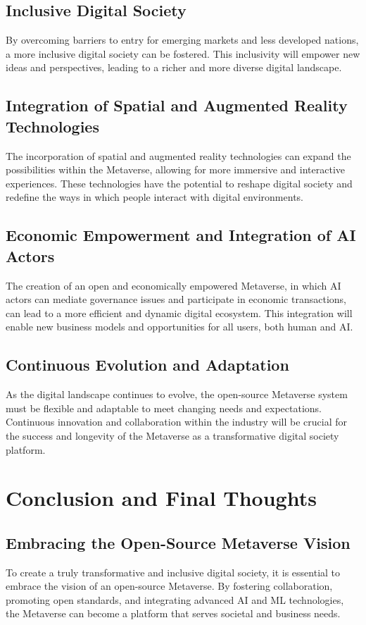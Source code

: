 \subsection{Inclusive Digital Society}
By overcoming barriers to entry for emerging markets and less developed nations, a more inclusive digital society can be fostered. This inclusivity will empower new ideas and perspectives, leading to a richer and more diverse digital landscape.

\subsection{Integration of Spatial and Augmented Reality Technologies}
The incorporation of spatial and augmented reality technologies can expand the possibilities within the Metaverse, allowing for more immersive and interactive experiences. These technologies have the potential to reshape digital society and redefine the ways in which people interact with digital environments.

\subsection{Economic Empowerment and Integration of AI Actors}
The creation of an open and economically empowered Metaverse, in which AI actors can mediate governance issues and participate in economic transactions, can lead to a more efficient and dynamic digital ecosystem. This integration will enable new business models and opportunities for all users, both human and AI.

\subsection{Continuous Evolution and Adaptation}
As the digital landscape continues to evolve, the open-source Metaverse system must be flexible and adaptable to meet changing needs and expectations. Continuous innovation and collaboration within the industry will be crucial for the success and longevity of the Metaverse as a transformative digital society platform.

\section{Conclusion and Final Thoughts}
\subsection{Embracing the Open-Source Metaverse Vision}
To create a truly transformative and inclusive digital society, it is essential to embrace the vision of an open-source Metaverse. By fostering collaboration, promoting open standards, and integrating advanced AI and ML technologies, the Metaverse can become a platform that serves societal and business needs.

